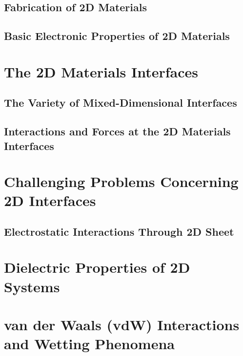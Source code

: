 \subsection{Fabrication of 2D Materials}
\label{sec:fabr-2d-mater}

\subsection{Basic Electronic Properties of 2D Materials}
\label{sec:basic-electr-prop}



\section{The 2D Materials Interfaces}
\label{sec:2d-mater-interf}

\subsection{The Variety of Mixed-Dimensional Interfaces}
\label{sec:vari-mixed-dimens}

\subsection{Interactions and Forces at the 2D Materials Interfaces}
\label{sec:inter-forc-at}

\section{Challenging Problems Concerning 2D Interfaces}
\label{sec:chall-probl-conc}

\subsection{Electrostatic Interactions Through 2D Sheet}
\label{sec:electr-inter-thro}

\section{Dielectric Properties of 2D Systems}
\label{sec:diel-prop-2d}

\section{van der Waals (vdW) Interactions and Wetting Phenomena}
\label{sec:van-der-waals}



